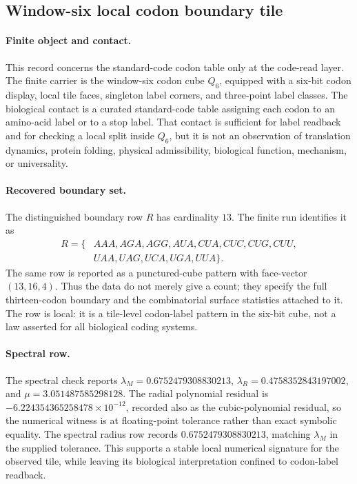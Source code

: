 \subsection{Window-six local codon boundary tile}
\label{sec:bioreality-codon-window6-local-tile-boundary}

\paragraph{Finite object and contact.}
This record concerns the standard-code codon table only at the code-read layer.  The finite carrier is the window-six codon cube $Q_6$, equipped with a six-bit codon display, local tile faces, singleton label corners, and three-point label classes.  The biological contact is a curated standard-code table assigning each codon to an amino-acid label or to a stop label.  That contact is sufficient for label readback and for checking a local split inside $Q_6$, but it is not an observation of translation dynamics, protein folding, physical admissibility, biological function, mechanism, or universality.

\paragraph{Recovered boundary set.}
The distinguished boundary row $R$ has cardinality $13$.  The finite run identifies it as
$$
\begin{aligned}
R=\{&AAA, AGA, AGG, AUA, CUA, CUC, CUG, CUU,\\
&UAA, UAG, UCA, UGA, UUA\}.
\end{aligned}
$$
The same row is reported as a punctured-cube pattern with face-vector $(13,16,4)$.  Thus the data do not merely give a count; they specify the full thirteen-codon boundary and the combinatorial surface statistics attached to it.  The row is local: it is a tile-level codon-label pattern in the six-bit cube, not a law asserted for all biological coding systems.

\paragraph{Spectral row.}
The spectral check reports $\lambda_M=0.6752479308830213$, $\lambda_R=0.4758352843197002$, and $\mu=3.051487585298128$.  The radial polynomial residual is $-6.224354365258478\times 10^{-12}$, recorded also as the cubic-polynomial residual, so the numerical witness is at floating-point tolerance rather than exact symbolic equality.  The spectral radius row records $0.6752479308830213$, matching $\lambda_M$ in the supplied tolerance.  This supports a stable local numerical signature for the observed tile, while leaving its biological interpretation confined to codon-label readback.

